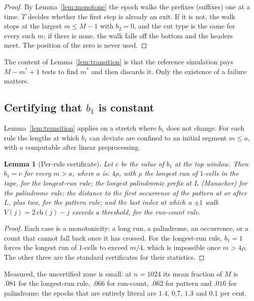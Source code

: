 \documentclass[11pt]{article}
\newtheorem{lemma}{Lemma}
\begin{document}
\begin{proof}
By Lemma~\ref{lem:monotone} the epoch walks the prefixes (suffixes) one at a time. $T$
decides whether the first step is already an exit. If it is not, the walk stops at the
largest $m\le M-1$ with $b_2=0$, and the cut type is the same for every such $m$; if there
is none, the walk falls off the bottom and the headers meet. The position of the zero is
never used.
\end{proof}

The content of Lemma~\ref{lem:transition} is that the reference simulation pays $M-m^*+1$
tests to find $m^*$ and then discards it. Only the existence of a failure matters.

\subsection{Certifying that $b_1$ is constant}

Lemma~\ref{lem:transition} applies on a stretch where $b_1$ does not change. For each rule
the lengths at which $b_1$ can deviate are confined to an initial segment $m\le a$, with
$a$ computable after linear preprocessing.

\begin{lemma}[Per-rule certificate]\label{lem:certificate}
Let $c$ be the value of $b_1$ at the top window. Then $b_1=c$ for every $m>a$, where $a$
is: $4\rho$, with $\rho$ the longest run of $1$-cells in the tape, for the longest-run
rule; the longest palindromic prefix at $L$ (Manacher) for the palindrome rule; the
distance to the first occurrence of the pattern at or after $L$, plus two, for the pattern
rule; and the last index at which a $\pm1$ walk $V(j)=2\,\mathrm{ch}(j)-j$ exceeds a
threshold, for the run-count rule.
\end{lemma}

\begin{proof}
Each case is a monotonicity: a long run, a palindrome, an occurrence, or a count that
cannot fall back once it has crossed. For the longest-run rule, $b_1=1$ forces the longest
run of $1$-cells to exceed $m/4$, which is impossible once $m>4\rho$. The other three are
the standard certificates for their statistics.
\end{proof}

Measured, the uncertified zone is small: at $n=1024$ its mean fraction of $M$ is $.081$
for the longest-run rule, $.066$ for run-count, $.062$ for pattern and $.016$ for
palindrome; the epochs that are entirely literal are $1.4$, $0.7$, $1.3$ and $0.1$ per
cent.
\end{document}
